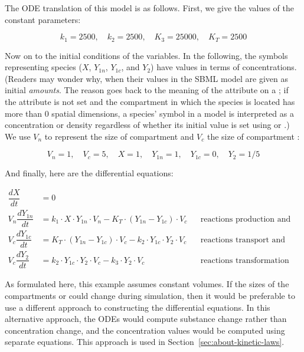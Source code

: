 The ODE translation of this model is as follows.  First, we give
the values of the constant parameters:
\begin{linenomath}
\begin{equation*}
  k_1 = 2500, \quad k_2 = 2500, \quad K_3 = 25000, \quad K_T = 2500
\end{equation*}
\end{linenomath}
Now on to the initial conditions of the variables.  In the
following, the symbols representing species ($X$, $Y_{1n}$,
$Y_{1c}$, and $Y_2$) have values in terms of concentrations.
(Readers may wonder why, when their values in the SBML
model are given as initial \emph{amounts}.  The reason goes back
to the meaning of the  attribute on
a \Species; if the attribute is not
set and the compartment in which the species is located has more
than 0 spatial dimensions, a species' symbol in a model is
interpreted as a concentration or density regardless of whether
its initial value is set using  or
.)  We use $V_n$ to represent the
size of compartment  and $V_c$ the
size of compartment :
\begin{linenomath}
\begin{equation*}
  V_n = 1, \quad V_c = 5, \quad X = 1, \quad Y_{1n} = 1, \quad Y_{1c} = 0, \quad Y_2 = 1/5
\end{equation*}
\end{linenomath}
And finally, here are the differential equations:
\begin{linenomath}
\begin{align*}
  \dfrac{d X}{d t}    &= 0 \\[6pt]
  V_n \dfrac{d Y_{1n}}{d t} &= k_1 \cdot X \cdot Y_{1n} \cdot V_n - K_T \cdot (Y_{1n} - Y_{1c}) \cdot V_c
    && \text{reactions production and transport} \\[6pt]
  V_c \dfrac{d Y_{1c}}{d t} &= K_T \cdot (Y_{1n} - Y_{1c}) \cdot V_c - k_2 \cdot Y_{1c} \cdot Y_2 \cdot V_c
    && \text{reactions transport and transformation} \\[6pt]
  V_c \dfrac{d Y_2}{d t}   &= k_2 \cdot Y_{1c} \cdot Y_2 \cdot V_c - k_3 \cdot Y_2 \cdot V_c
    && \text{reactions transformation and degradation}
\end{align*}
\end{linenomath}

As formulated here, this example assumes constant volumes.  If the
sizes of the compartments  or  could
change during simulation, then it would be preferable to use a
different approach to constructing the differential equations.  In
this alternative approach, the ODEs would compute substance change
rather than concentration change, and the concentration values
would be computed using separate equations.  This approach is used
in Section~\ref{sec:about-kinetic-laws}.


